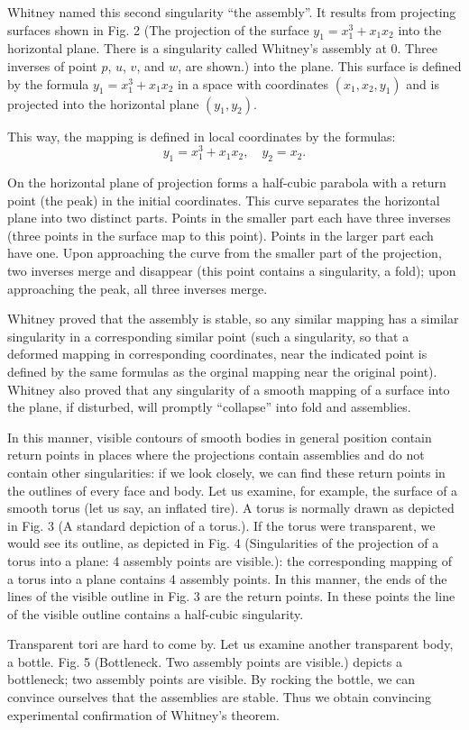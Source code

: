 \documentclass[12pt]{amsart}
\begin{document}
Whitney named this second singularity ``the assembly''.
It results from projecting surfaces shown in Fig. 2 (The projection of the
surface $y_1=x_1^3+x_1x_2$ into the horizontal plane.
There is a singularity called Whitney's assembly at 0.
Three inverses of point $p$, $u$, $v$, and $w$, are shown.) into the plane.
This surface is defined by the formula $y_1=x_1^3+x_1x_2$ in a space with
coordinates $(x_1,x_2,y_1)$ and is projected into the horizontal plane
$(y_1,y_2)$.

This way, the mapping is defined in local coordinates by the formulas:
$$y_1=x_1^3+x_1x_2,\quad y_2=x_2.$$

On the horizontal plane of projection forms a half-cubic parabola with a return
point (the peak) in the initial coordinates.
This curve separates the horizontal plane into two distinct parts.
Points in the smaller part each have three inverses (three points in the surface
map to this point).
Points in the larger part each have one.
Upon approaching the curve from the smaller part of the projection, two inverses
merge and disappear (this point contains a singularity, a fold); upon
approaching the peak, all three inverses merge.

Whitney proved that the assembly is stable, so any similar mapping has a
similar singularity in a corresponding similar point (such a singularity, so
that a deformed mapping in corresponding coordinates, near the indicated point
is defined by the same formulas as the orginal mapping near the original point).
Whitney also proved that any singularity of a smooth mapping of a surface into
the plane, if disturbed, will promptly ``collapse'' into fold and assemblies.

In this manner, visible contours of smooth bodies in general position contain
return points in places where the projections contain assemblies and do not
contain other singularities: if we look closely, we can find these return points
in the outlines of every face and body.
Let us examine, for example, the surface of a smooth torus (let us say, an
inflated tire).
A torus is normally drawn as depicted in Fig. 3 (A standard depiction of a
torus.).
If the torus were transparent, we would see its outline, as depicted in Fig. 4
(Singularities of the projection of a torus into a plane: 4 assembly points are
visible.): the corresponding mapping of a torus into a plane contains 4 assembly
points.
In this manner, the ends of the lines of the visible outline in Fig. 3 are the
return points.
In these points the line of the visible outline contains a half-cubic singularity.

Transparent tori are hard to come by.
Let us examine another transparent body, a bottle.
Fig. 5 (Bottleneck.
Two assembly points are visible.) depicts a bottleneck; two assembly points are
visible.
By rocking the bottle, we can convince ourselves that the assemblies are stable.
Thus we obtain convincing experimental confirmation of Whitney's theorem.
\end{document}
